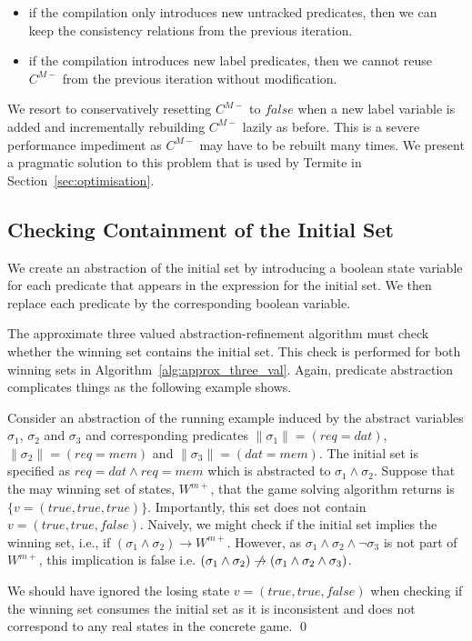 \begin{itemize}
    \item if the compilation only introduces new untracked predicates, then we can keep the consistency relations from the previous iteration.
    \item if the compilation introduces new label predicates, then we cannot reuse $C^{M-}$ from the previous iteration without modification.
\end{itemize}

We resort to conservatively resetting $C^{M-}$ to $false$ when a new label variable is added and incrementally rebuilding $C^{M-}$ lazily as before. This is a severe performance impediment as $C^{M-}$ may have to be rebuilt many times. We present a pragmatic solution to this problem that is used by Termite in Section~\ref{sec:optimisation}.

\subsection{Checking Containment of the Initial Set}
\label{sec:init_containment}

We create an abstraction of the initial set by introducing a boolean state variable for each predicate that appears in the expression for the initial set. We then replace each predicate by the corresponding boolean variable.

The approximate three valued abstraction-refinement algorithm must check whether the winning set contains the initial set. This check is performed for both winning sets in Algorithm~\ref{alg:approx_three_val}. Again, predicate abstraction complicates things as the following example shows.

\begin{ex}
    Consider an abstraction of the running example induced by the abstract variables $\sigma_1$, $\sigma_2$ and $\sigma_3$ and corresponding predicates $\|\sigma_1\| = (req=dat)$, $\|\sigma_2\| = (req=mem)$ and $\|\sigma_3\| = (dat=mem)$. The initial set is specified as $req=dat \land req=mem$ which is abstracted to $\sigma_1 \land \sigma_2$. Suppose that the may winning set of states, $W^{m+}$, that the game solving algorithm returns is $\{v=(true, true, true)\}$. Importantly, this set does not contain $v=(true, true, false)$. Naively, we might check if the initial set implies the winning set, i.e., if $(\sigma_1 \land \sigma_2) \rightarrow W^{m+}$. However, as $\sigma_1 \land \sigma_2 \land \neg\sigma_3$ is not part of $W^{m+}$, this implication is false i.e. $(\sigma_1 \land \sigma_2) \centernot\rightarrow (\sigma_1 \land \sigma_2 \land \sigma_3)$.

    We should have ignored the losing state $v=(true, true, false)$ when checking if the winning set consumes the initial set as it is inconsistent and does not correspond to any real states in the concrete game. 
    \qed
\end{ex}

